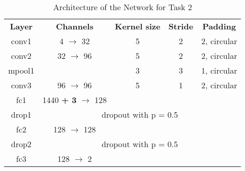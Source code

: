 

\begin{table}[htbp]
	\caption{Architecture of the Network for Task 2}
	\begin{center}
		\begin{tabular}{|c|c|c|c|c|}
			\hline
			\textbf{Layer}&\textbf{Channels} &\textbf{Kernel size} 
			&\textbf{Stride} &\textbf{Padding}\\
			\cline{1-5}
			conv1  &  4 $\rightarrow$ 	32 & 5 & 2 & 2, circular \\ \hline
			conv2  & 32 $\rightarrow$  	96 & 5 & 2 & 2, circular \\ \hline
			mpool1 & 					   & 3	& 3 & 1, circular \\ 
			\hline			
			conv3  & 96 $\rightarrow$  	96 & 5 & 1 & 2, circular \\ \hline
			fc1   &  1440 \textbf{+ 3} $\rightarrow$ 128 &  &  &  \\ \hline
			drop1 & \multicolumn{4}{c|}{dropout with p = 0.5} \\ \hline
			fc2   &  128 $\rightarrow$ 128 &  &  &  \\ \hline
			 drop2 & \multicolumn{4}{c|}{ dropout with p = 0.5} \\ \hline
			fc3 &  128 $\rightarrow$   2 &  &  &  \\ \hline
		\end{tabular}
		\label{tab: task 2}
	\end{center}
\end{table}
